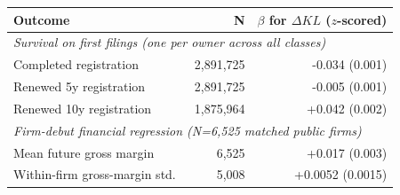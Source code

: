 \begin{tabular}{lrr}
\toprule
Outcome & N & $\beta$ for $\Delta KL$ ($z$-scored) \\
\midrule
\multicolumn{3}{l}{\textit{Survival on first filings (one per owner across all classes)}} \\
\midrule
Completed registration & 2,891,725 & -0.034 (0.001) \\
Renewed 5y registration & 2,891,725 & -0.005 (0.001) \\
Renewed 10y registration & 1,875,964 & +0.042 (0.002) \\
\midrule
\multicolumn{3}{l}{\textit{Firm-debut financial regression (N=6,525 matched public firms)}} \\
\midrule
Mean future gross margin & 6,525 & +0.017 (0.003) \\
Within-firm gross-margin std.\ & 5,008 & +0.0052 (0.0015) \\
\bottomrule
\end{tabular}

